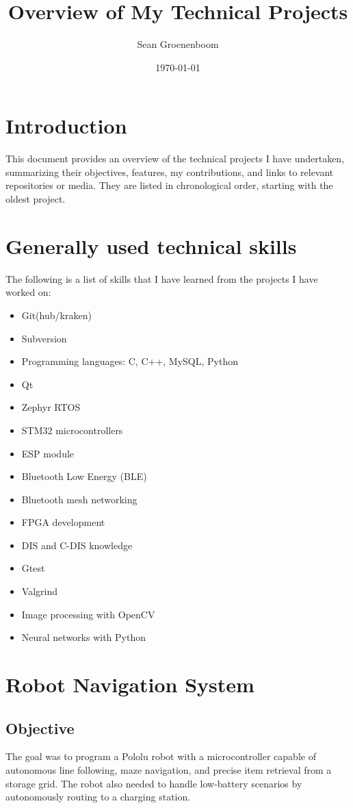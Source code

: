 \documentclass{article}
\title{Overview of My Technical Projects}
\author{Sean Groenenboom}
\date{\today}
\begin{document}
\maketitle

\tableofcontents

\section{Introduction}
This document provides an overview of the technical projects I have undertaken, summarizing their objectives, features, my contributions, and links to relevant repositories or media.
They are listed in chronological order, starting with the oldest project.

\section{Generally used technical skills}
The following is a list of skills that I have learned from the projects I have worked on:

\begin{itemize}
    \item Git(hub/kraken)
    \item Subversion
    \item Programming languages: C, C++, MySQL, Python
    \item Qt
    \item Zephyr RTOS
    \item STM32 microcontrollers
    \item ESP module
    \item Bluetooth Low Energy (BLE)
    \item Bluetooth mesh networking
    \item FPGA development
    \item DIS and C-DIS knowledge
    \item Gtest
    \item Valgrind
    \item Image processing with OpenCV
    \item Neural networks with Python
\end{itemize}

\section{Robot Navigation System}
\subsection{Objective}
The goal was to program a Pololu robot with a microcontroller capable of autonomous line following, maze navigation, and precise item retrieval from a storage grid. The robot also needed to handle low-battery scenarios by autonomously routing to a charging station.
\end{document}

